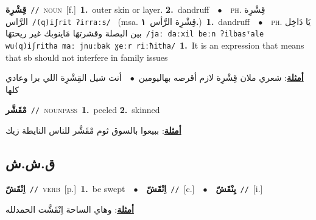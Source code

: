 \documentclass[10pt,a4paper,twoside]{article} %
\begin{document}
\begin{multicols}{2}
{\setlength\topsep{0pt}\textbf{\foreignlanguage{arabic}{قِشْرِة}}\ {\color{gray}\texttt{//}\color{black}}\ \textsc{noun}\ [f.]\ \textbf{1.}~outer skin or layer.  \textbf{2.}~dandruff\ \ $\bullet$\ \ \textsc{ph.} \color{gray} \foreignlanguage{arabic}{قِشْرِة الرَّاس}\color{black}\ {\color{gray}\texttt{/{\sffamily (q)iʃrit ʔirraːs}/}\color{black}}\ \color{gray} (msa. \foreignlanguage{arabic}{قِشْرِة الرَّأس}~\foreignlanguage{arabic}{\textbf{١.}})\color{black}\ \textbf{1.}~dandruff\ \ $\bullet$\ \ \textsc{ph.} \color{gray} \foreignlanguage{arabic}{يَا دَاخِل بين البصلة وقشرتهَا مَاينوبك غير ريحتهَا}\color{black}\ {\color{gray}\texttt{/{\sffamily jaː daːxil beːn ʔilbasˤale wu(q)iʃritha maː jnuːbak ɣeːr riːħitha}/}\color{black}}\ \textbf{1.}~It is an expression that means that sb should not interfere in family issues\  \begin{flushright}\color{gray}\foreignlanguage{arabic}{\textbf{\underline{\foreignlanguage{arabic}{أمثلة}}}: شعري ملان قِشْرِة لازم أقرصه بهاليومين\ $\bullet$\ \  أنت شيل القِشْرِة اللي برا وعادي كلها}\end{flushright}\color{black}} \vspace{2mm}

{\setlength\topsep{0pt}\textbf{\foreignlanguage{arabic}{مْقَشَّر}}\ {\color{gray}\texttt{//}\color{black}}\ \textsc{noun\textunderscore pass}\ \textbf{1.}~peeled  \textbf{2.}~skinned\  \begin{flushright}\color{gray}\foreignlanguage{arabic}{\textbf{\underline{\foreignlanguage{arabic}{أمثلة}}}: ببيعوا بالسوق ثوم مْقَشَّر للناس النايطة زيك}\end{flushright}\color{black}} \vspace{2mm}

\vspace{-3mm}
\subsection*{\color{blue}\foreignlanguage{arabic}{ق.ش.ش}\color{blue}{}} 

{\setlength\topsep{0pt}\textbf{\foreignlanguage{arabic}{اِنْقَشّ}}\ {\color{gray}\texttt{//}\color{black}}\ \textsc{verb}\ [p.]\ \textbf{1.}~be swept\ \ $\bullet$\ \ \setlength\topsep{0pt}\textbf{\foreignlanguage{arabic}{اِنْقَشّ}}\ {\color{gray}\texttt{//}\color{black}}\ [c.]\ \ $\bullet$\ \ \setlength\topsep{0pt}\textbf{\foreignlanguage{arabic}{يِنْقَشّ}}\ {\color{gray}\texttt{//}\color{black}}\ [i.]\  \begin{flushright}\color{gray}\foreignlanguage{arabic}{\textbf{\underline{\foreignlanguage{arabic}{أمثلة}}}: وهاي الساحة اِنْقَشَّت الحمدلله}\end{flushright}\color{black}} \vspace{2mm}


\end{multicols}
\end{document}
